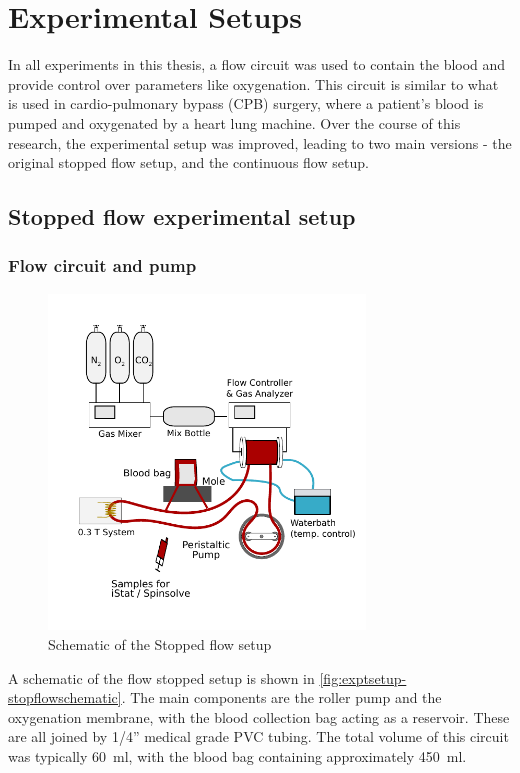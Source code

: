 \chapter{Experimental Setups}
\label{ch:exptsetup}

In all experiments in this thesis, a flow circuit was used to contain the blood and provide control over parameters like oxygenation.
This circuit is similar to what is used in cardio-pulmonary bypass (CPB) surgery, where a patient's blood is pumped and oxygenated by a heart lung machine.
Over the course of this research, the experimental setup was improved, leading to two main versions - the original stopped flow setup, and the continuous flow setup.

\section{Stopped flow experimental setup}
\label{sec:exptsetup-stopflow}

\subsection{Flow circuit and pump}
\label{sec:exptsetup-flowcircuitandpump}
\begin{figure}[t]
\centering
\includegraphics[width=0.75\textwidth]{figures/exptsetup/BloodMixingSetup.pdf}
\caption{Schematic of the Stopped flow setup}
\label{fig:exptsetup-stopflowschematic}
\end{figure}

A schematic of the flow stopped setup is shown in \autoref{fig:exptsetup-stopflowschematic}.
The main components are the roller pump and the oxygenation membrane, with the blood collection bag acting as a reservoir.
These are all joined by 1/4'' medical grade PVC tubing.
The total volume of this circuit was typically \SI{60}{\milli\litre}, with the blood bag containing approximately \SI{450}{ml}.

